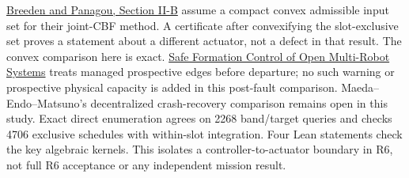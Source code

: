 \documentclass{article}
\begin{document}
\href{https://arxiv.org/html/2210.01354v2}{Breeden and Panagou,
Section II-B} assume a compact convex admissible input set for
their joint-CBF method. A certificate after convexifying the
slot-exclusive set proves a statement about a different actuator,
not a defect in that result. The convex comparison here is exact.
\href{https://arxiv.org/html/2609.29939v1}{Safe Formation Control of
Open Multi-Robot Systems} treats managed prospective edges before
departure; no such warning or prospective physical capacity is added
in this post-fault comparison. Maeda--Endo--Matsuno's decentralized
crash-recovery comparison remains open in this study.
Exact direct enumeration agrees on 2268 band/target queries and
checks 4706 exclusive schedules with within-slot integration. Four
Lean statements check the key algebraic kernels. This isolates a
controller-to-actuator boundary in R6, not full R6 acceptance or
any independent mission result.
\end{document}
